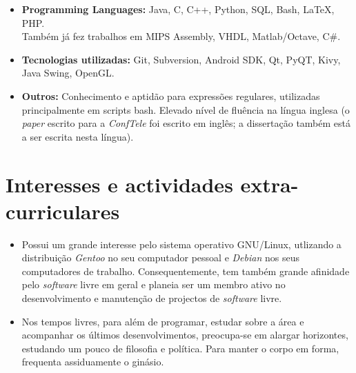 \documentclass[11pt,a4paper,sans]{moderncv} %
\begin{document}
\begin{itemize}

\item \textbf{Programming Languages:} Java, C, C++, Python, SQL, Bash, LaTeX, PHP. \\
  Também já fez trabalhos em MIPS Assembly, VHDL, Matlab/Octave, C\#.

\vspace{6pt}

\item \textbf{Tecnologias utilizadas:} Git, Subversion, Android SDK, Qt, PyQT,
  Kivy, Java Swing, OpenGL.

\vspace{6pt}

\item \textbf{Outros: } Conhecimento e aptidão para expressões regulares,
  utilizadas principalmente em scripts bash. Elevado nível de fluência na língua
  inglesa (o \textit{paper} escrito para a \textit{ConfTele} foi escrito em
  inglês; a dissertação também está a ser escrita nesta língua).

\end{itemize}

\section{Interesses e actividades extra-curriculares}

\vspace{6pt}

\begin{itemize}

\item{Possui um grande interesse pelo sistema operativo GNU/Linux, utlizando a
    distribuição \textit{Gentoo} no seu computador pessoal e \textit{Debian} nos
    seus computadores de trabalho.  Consequentemente, tem também grande
    afinidade pelo \textit{software} livre em geral e planeia ser um membro
    ativo no desenvolvimento e manutenção de projectos de \textit{software}
    livre.}

\vspace{6pt}

\item{Nos tempos livres, para além de programar, estudar sobre a área e
    acompanhar os últimos desenvolvimentos, preocupa-se em alargar horizontes,
    estudando um pouco de filosofia e política. Para manter o corpo em forma,
    frequenta assiduamente o ginásio.}

\end{itemize}
\end{document}
